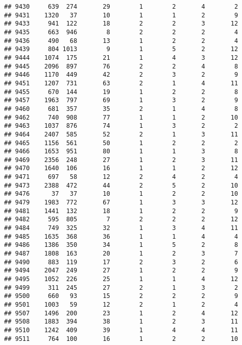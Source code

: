 \documentclass[]{article}
\begin{document}
\begin{verbatim}
## 9430     639  274       29        1        2       4        2
## 9431    1320   37       10        1        1       2        9
## 9433     941  122       18        2        2       3       12
## 9435     663  946        8        2        2       2        4
## 9436     490   68       13        1        2       2        4
## 9439     804 1013        9        1        5       2       12
## 9444    1074  175       21        1        4       3       12
## 9445    2096  897       76        2        2       4        8
## 9446    1170  449       42        2        3       2        9
## 9451    1207  731       63        2        1       4       11
## 9455     670  144       19        1        2       2        8
## 9457    1963  797       69        1        3       2        9
## 9460     681  357       35        2        1       4        8
## 9462     740  908       77        1        1       2       10
## 9463    1037  876       74        1        3       2        2
## 9464    2407  585       52        2        1       3       11
## 9465    1156  561       50        1        2       2        2
## 9466    1653  951       80        1        1       3        8
## 9469    2356  248       27        1        2       3       11
## 9470    1640  106       16        1        1       2       12
## 9471     697   58       12        2        4       2        4
## 9473    2388  472       44        2        5       2       10
## 9476      37   37       10        1        2       2       10
## 9479    1983  772       67        1        3       3       12
## 9481    1441  132       18        1        2       2        9
## 9482     595  805        7        2        2       2       12
## 9484     749  325       32        1        3       4       11
## 9485    1635  368       36        1        1       4        4
## 9486    1386  350       34        1        5       2        8
## 9487    1808  163       20        1        2       3        7
## 9490     883  119       17        2        3       2        6
## 9494    2047  249       27        1        2       2        9
## 9495    1052  226       25        1        1       4       12
## 9499     311  245       27        2        1       3        2
## 9500     660   93       15        2        2       2        9
## 9501    1003   59       12        2        1       2        4
## 9507    1496  200       23        1        2       4       12
## 9508    1883  394       38        1        2       3       11
## 9510    1242  409       39        1        4       4       11
## 9511     764  100       16        1        2       2       10

\end{verbatim}
\end{document}
